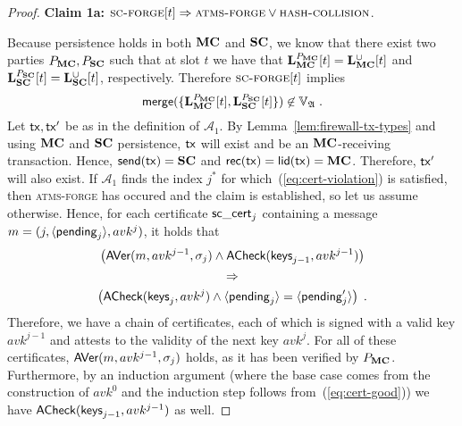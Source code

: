 \begin{proof}
  \textbf{Claim 1a:}
  $\textsc{sc-forge}[t] \Rightarrow \textsc{atms-forge} \lor \textsc{hash-collision}$.

  \noindent
  Because persistence holds in both $\mathbf{MC}$ and $\mathbf{SC}$, we know that there exist two parties $P_{\mathbf{MC}}, P_{\mathbf{SC}}$
  such that at slot $t$ we have that $\mathbf{L}_{\mathbf{MC}}^{P_{\mathbf{MC}}}[t] =
  \mathbf{L}_{\mathbf{MC}}^{\cup}[t]$ and $\mathbf{L}_{\mathbf{SC}}^{P_{\mathbf{SC}}}[t] =
  \mathbf{L}_{\mathbf{SC}}^{\cup}[t]$,
  respectively. Therefore $\textsc{sc-forge}[t]$ implies
  $$
    \mathsf{merge}(\{
      \mathbf{L}_{\mathbf{MC}}^{P_{\mathbf{MC}}}[t],
      \mathbf{L}_{\mathbf{SC}}^{P_{\mathbf{SC}}}[t]
    \}) \not\in \mathbb{V}_{\mathfrak{A}}
  \; .
  $$
  Let $\mathsf{tx}, \mathsf{tx}'$ be as in the definition of
  $\mathcal{A}_1$.
  By Lemma~\ref{lem:firewall-tx-types} and using $\mathbf{MC}$ and $\mathbf{SC}$
  persistence, $\mathsf{tx}$ will exist and
  be an $\mathbf{MC}$-receiving transaction.
  Hence, $\mathsf{send}(\mathsf{tx}) = \mathbf{SC}$ and $\mathsf{rec}(\mathsf{tx}) = \mathsf{lid}(\mathsf{tx}) = \mathbf{MC}$.
  Therefore, $\mathsf{tx}'$ will also exist.
  If $\mathcal{A}_1$ finds the index $j^*$ for which~(\ref{eq:cert-violation})
  is satisfied,
  then \textsc{atms-forge} has occured and the claim is established, so let us assume otherwise.
  Hence, for each certificate
  $\mathsf{sc\_cert}_j$ containing a message $m = (j,\langle\mathsf{pending}_j\rangle, avk^j)$, it
  holds that
  \begin{equation}
    \label{eq:cert-good}
    \begin{gathered}
    \left(
      \textsf{AVer}(m, avk^{j-1}, \sigma_j)
      \land
      \textsf{ACheck}(\textsf{keys}_{j-1}, avk^{j-1})
    \right)\\
    \Rightarrow\\
    \left(
      \textsf{ACheck}(\textsf{keys}_j, avk^j)
      \land
      \langle\mathsf{pending}_j\rangle = \langle\mathsf{pending}'_j\rangle
    \right)
    \; .
    \end{gathered}
  \end{equation}
  Therefore, we have a chain of certificates, each of which is signed with a
  valid key $avk^{j-1}$ and attests to the validity of the next key $avk^j$.
  For all of these certificates, $\textsf{AVer}(m, avk^{j-1}, \sigma_j)$ holds,
  as it has been verified by $P_{\mathbf{MC}}$.
  Furthermore, by an induction argument (where the base case comes from the
  construction of $avk^0$ and the induction step follows
  from~(\ref{eq:cert-good})) we have
  $\textsf{ACheck}(\textsf{keys}_{j-1}, avk^{j-1})$ as well.


\end{proof}
